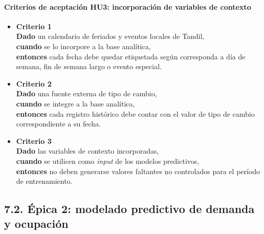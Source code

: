 \documentclass[
11pt, %
]{charter}
\begin{document}
\paragraph{Criterios de aceptación HU3: incorporación de variables de contexto}
\begin{itemize}
  \item \textbf{Criterio 1} \\
  \textbf{Dado} un calendario de feriados y eventos locales de Tandil, \\
  \textbf{cuando} se lo incorpore a la base analítica, \\
  \textbf{entonces} cada fecha debe quedar etiquetada según corresponda a día de semana, fin de semana largo o evento especial.

  \item \textbf{Criterio 2} \\
  \textbf{Dado} una fuente externa de tipo de cambio, \\
  \textbf{cuando} se integre a la base analítica, \\
  \textbf{entonces} cada registro histórico debe contar con el valor de tipo de cambio correspondiente a su fecha.

  \item \textbf{Criterio 3} \\
  \textbf{Dado} las variables de contexto incorporadas, \\
  \textbf{cuando} se utilicen como \textit{input} de los modelos predictivos, \\
  \textbf{entonces} no deben generarse valores faltantes no controlados para el período de entrenamiento.
\end{itemize}

\subsection*{7.2. Épica 2: modelado predictivo de demanda y ocupación}
\end{document}
